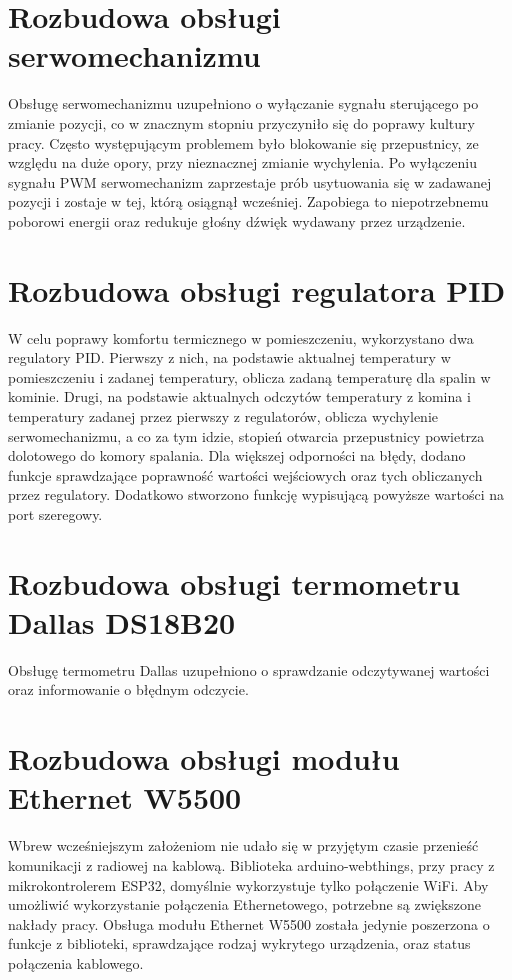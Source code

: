 \documentclass[11pt]{report}
\begin{document}
 \section{Rozbudowa obsługi serwomechanizmu}
 Obsługę serwomechanizmu uzupełniono o wyłączanie sygnału sterującego po zmianie pozycji, co w znacznym stopniu przyczyniło się do poprawy kultury pracy. Często występującym problemem było blokowanie się przepustnicy, ze względu na duże opory, przy nieznacznej zmianie wychylenia. Po wyłączeniu sygnału PWM serwomechanizm zaprzestaje prób usytuowania się w zadawanej pozycji i zostaje w tej, którą osiągnął wcześniej. Zapobiega to niepotrzebnemu poborowi energii oraz redukuje głośny dźwięk wydawany przez urządzenie.

 \section{Rozbudowa obsługi regulatora PID}
 W celu poprawy komfortu termicznego w pomieszczeniu, wykorzystano dwa regulatory PID. Pierwszy z nich, na podstawie aktualnej temperatury w pomieszczeniu i zadanej temperatury, oblicza zadaną temperaturę dla spalin w kominie. Drugi, na podstawie aktualnych odczytów temperatury z komina i temperatury zadanej przez pierwszy z regulatorów, oblicza wychylenie serwomechanizmu, a co za tym idzie, stopień otwarcia przepustnicy powietrza dolotowego do komory spalania.
 Dla większej odporności na błędy, dodano funkcje sprawdzające poprawność wartości wejściowych oraz tych obliczanych przez regulatory. Dodatkowo stworzono funkcję wypisującą powyższe wartości na port szeregowy.

 \section{Rozbudowa obsługi termometru Dallas DS18B20}
 Obsługę termometru Dallas uzupełniono o sprawdzanie odczytywanej wartości oraz informowanie o błędnym odczycie.

 \section{Rozbudowa obsługi modułu Ethernet W5500}
 Wbrew wcześniejszym założeniom nie udało się w przyjętym czasie przenieść komunikacji z radiowej na kablową.
Biblioteka arduino-webthings, przy pracy z mikrokontrolerem ESP32, domyślnie wykorzystuje tylko połączenie WiFi. Aby umożliwić wykorzystanie połączenia Ethernetowego, potrzebne są zwiększone nakłady pracy.
  Obsługa modułu Ethernet W5500 została jedynie poszerzona o funkcje z biblioteki, sprawdzające rodzaj wykrytego urządzenia, oraz status połączenia kablowego.
 
\end{document}
